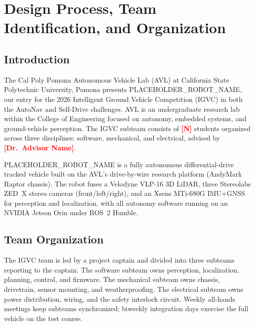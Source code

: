 \documentclass[11pt, letterpaper]{article}
\newcommand{\placeholder}[1]{\textcolor{red}{\textbf{[#1]}}}
\newcommand{\robotname}{PLACEHOLDER\_ROBOT\_NAME}
\newcommand{\teamname}{Cal Poly Pomona Autonomous Vehicle Lab}
\newcommand{\university}{California State Polytechnic University, Pomona}
\begin{document}
\tableofcontents
\thispagestyle{fancy}
\newpage

\section{Design Process, Team Identification, and Organization}

\subsection{Introduction}

The \teamname{} (AVL) at \university{} presents \robotname{}, our entry for the
2026 Intelligent Ground Vehicle Competition (IGVC) in both the AutoNav and Self-Drive
challenges. AVL is an undergraduate research lab within the College of Engineering focused
on autonomy, embedded systems, and ground-vehicle perception. The IGVC subteam consists of
\placeholder{N} students organized across three disciplines: software, mechanical, and
electrical, advised by \placeholder{Dr.~Advisor Name}.

\robotname{} is a fully autonomous differential-drive tracked vehicle built on the AVL's
drive-by-wire research platform (AndyMark Raptor chassis). The robot fuses a Velodyne VLP-16
3D LiDAR, three Stereolabs ZED~X stereo cameras (front/left/right), and an Xsens MTi-680G
IMU+GNSS for perception and localization, with all autonomy software running on an NVIDIA
Jetson Orin under ROS~2 Humble.

\subsection{Team Organization}

The IGVC team is led by a project captain and divided into three subteams reporting to the
captain. The software subteam owns perception, localization, planning, control, and
firmware. The mechanical subteam owns chassis, drivetrain, sensor mounting, and
weatherproofing. The electrical subteam owns power distribution, wiring, and the
safety interlock circuit. Weekly all-hands meetings keep subteams synchronized; biweekly
integration days exercise the full vehicle on the test course.
\end{document}
